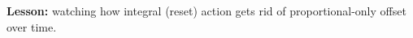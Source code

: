 












{\bf Lesson:} watching how integral (reset) action gets rid of proportional-only offset over time.




